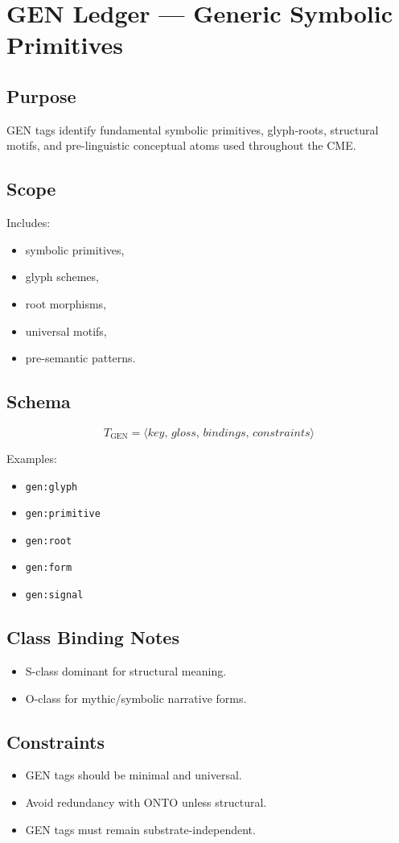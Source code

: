 \chapter{GEN Ledger --- Generic Symbolic Primitives}
\label{chap:GEN_Ledger}

\section{Purpose}

GEN tags identify fundamental symbolic primitives, glyph-roots, structural
motifs, and pre-linguistic conceptual atoms used throughout the CME.

\section{Scope}

Includes:
\begin{itemize}
    \item symbolic primitives,
    \item glyph schemes,
    \item root morphisms,
    \item universal motifs,
    \item pre-semantic patterns.
\end{itemize}

\section{Schema}

\[
T_{\text{GEN}} = \langle key,\, gloss,\, bindings,\, constraints \rangle
\]

Examples:
\begin{itemize}
    \item \texttt{gen:glyph}
    \item \texttt{gen:primitive}
    \item \texttt{gen:root}
    \item \texttt{gen:form}
    \item \texttt{gen:signal}
\end{itemize}

\section{Class Binding Notes}

\begin{itemize}
    \item S-class dominant for structural meaning.
    \item O-class for mythic/symbolic narrative forms.
\end{itemize}

\section{Constraints}

\begin{itemize}
    \item GEN tags should be minimal and universal.
    \item Avoid redundancy with ONTO unless structural.
    \item GEN tags must remain substrate-independent.
\end{itemize}
